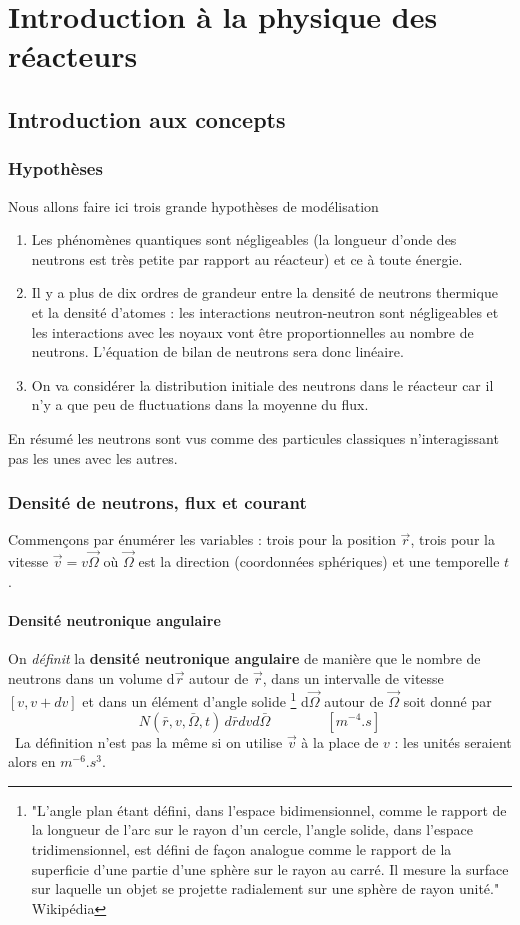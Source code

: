 \chapter{Introduction à la physique des réacteurs}
\section{Introduction aux concepts}
\subsection{Hypothèses}
Nous allons faire ici trois grande hypothèses de modélisation
\begin{enumerate}
\item Les phénomènes quantiques sont négligeables (la longueur d'onde des neutrons est très petite 
par rapport au réacteur) et ce à toute énergie.
\item Il y a plus de dix ordres de grandeur entre la densité de neutrons thermique et la densité 
d'atomes : les interactions neutron-neutron sont négligeables et les interactions avec les noyaux 
vont être proportionnelles au nombre de neutrons. L'équation de bilan de neutrons sera donc linéaire.
\item On va considérer la distribution initiale des neutrons dans le réacteur car il n'y a que peu 
de fluctuations dans la moyenne du flux.
\end{enumerate}
En résumé les neutrons sont vus comme des particules classiques n'interagissant pas les unes avec 
les autres.

\subsection{Densité de neutrons, flux et courant}
Commençons par énumérer les variables : trois pour la position $\vec{r}$, trois pour la vitesse 
$\vec{v} =v\vec{\Omega}$ où $\vec\Omega$ est la direction (coordonnées sphériques) et une temporelle
$t$.

\subsubsection{Densité neutronique angulaire}
On \textit{définit} la \textbf{densité neutronique angulaire} de manière que le nombre de neutrons dans 
un volume d$\vec{r}$ autour de $\vec{r}$, dans un intervalle de vitesse $[v,v+dv]$ et dans un 
élément d'angle solide \footnote{"L'angle plan étant défini, dans l'espace bidimensionnel, comme le rapport de la longueur de l'arc sur le rayon d'un cercle, l'angle solide, dans l'espace tridimensionnel, est défini de façon analogue comme le rapport de la superficie d'une partie d'une sphère sur le rayon au carré.
Il mesure la surface sur laquelle un objet se projette radialement sur une sphère de rayon unité." Wikipédia}
 d$\vec\Omega$ autour de $\vec{\Omega}$ soit donné par
\begin{equation}
N(\bar r,v,\bar \Omega ,t)\,d\bar rdvd\bar \Omega\qquad\qquad [m^{-4}.s]
\end{equation}
\danger\ La définition n'est pas la même si on utilise $\vec{v}$ à la place de $v$ : les unités 
seraient alors en $m^{-6}.s^3$.

